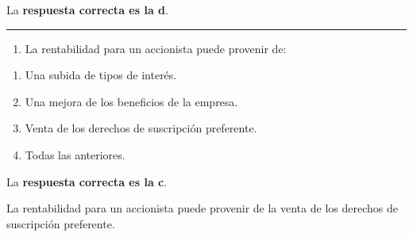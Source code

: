 \documentclass[
  letterpaper,
  DIV=11,
  numbers=noendperiod]{scrreprt}
\providecommand{\tightlist}{%
  \setlength{\itemsep}{0pt}\setlength{\parskip}{0pt}}\usepackage{longtable,booktabs,array}
\begin{document}
\begin{tcolorbox}[enhanced jigsaw, left=2mm, opacityback=0, colback=white, breakable, arc=.35mm, bottomrule=.15mm, rightrule=.15mm, toprule=.15mm, leftrule=.75mm, colframe=quarto-callout-tip-color-frame]
\begin{minipage}[t]{5.5mm}
\textcolor{quarto-callout-tip-color}{\faLightbulb}
\end{minipage}%
\begin{minipage}[t]{\textwidth - 5.5mm}

La \textbf{respuesta correcta es la d}.

\end{minipage}%
\end{tcolorbox}

\begin{center}\rule{0.5\linewidth}{0.5pt}\end{center}

\begin{enumerate}
\def\labelenumi{\arabic{enumi}.}
\setcounter{enumi}{75}
\tightlist
\item
  La rentabilidad para un accionista puede provenir de:
\end{enumerate}

\begin{enumerate}
\def\labelenumi{\alph{enumi}.}
\item
  Una subida de tipos de interés.
\item
  Una mejora de los beneficios de la empresa.
\item
  Venta de los derechos de suscripción preferente.
\item
  Todas las anteriores.
\end{enumerate}

\begin{tcolorbox}[enhanced jigsaw, left=2mm, opacityback=0, colback=white, breakable, arc=.35mm, bottomrule=.15mm, rightrule=.15mm, toprule=.15mm, leftrule=.75mm, colframe=quarto-callout-tip-color-frame]
\begin{minipage}[t]{5.5mm}
\textcolor{quarto-callout-tip-color}{\faLightbulb}
\end{minipage}%
\begin{minipage}[t]{\textwidth - 5.5mm}

La \textbf{respuesta correcta es la c}.

La rentabilidad para un accionista puede provenir de la venta de los
derechos de suscripción preferente.

\end{minipage}%
\end{tcolorbox}
\end{document}

